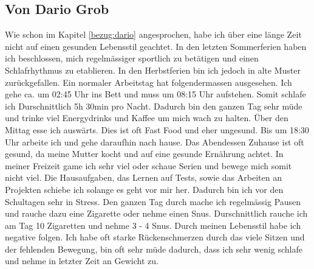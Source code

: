 \subsection{Von Dario Grob}
\authortoc{\dario}{\subsectionident}
Wie schon im Kapitel \ref{bezug:dario} angesprochen, habe ich über eine länge Zeit nicht auf einen gesunden Lebensstil geachtet. In den letzten Sommerferien haben ich beschlossen, mich regelmässiger sportlich zu betätigen und einen Schlafrhythmus zu etablieren. 
\newline
In den Herbstferien bin ich jedoch in alte Muster zurückgefallen. Ein normaler Arbeitstag hat folgendermassen ausgesehen.
\newline
Ich gehe ca. um 02:45 Uhr ins Bett und muss um 08:15 Uhr aufstehen. Somit schlafe ich Durschnittlich 5h 30min pro Nacht. Dadurch bin den ganzen Tag sehr müde und trinke viel Energydrinks und Kaffee um mich wach zu halten. 
\newline
Über den Mittag esse ich auswärts. Dies ist oft Fast Food und eher ungesund.
\newline
Bis um 18:30 Uhr arbeite ich und gehe daraufhin nach hause. Das Abendessen Zuhause ist oft gesund, da meine Mutter kocht und auf eine gesunde Ernährung achtet. 
\newline
In meiner Freizeit game ich sehr viel oder schaue Serien und bewege mich somit nicht viel. 
\newline
Die Hausaufgaben, das Lernen auf Tests, sowie das Arbeiten an Projekten schiebe ich solange es geht vor mir her. Dadurch bin ich vor den Schultagen sehr in Stress.
\newline
Den ganzen Tag durch mache ich regelmässig Pausen und rauche dazu eine Zigarette oder nehme einen Snus. Durschnittlich rauche ich am Tag 10 Zigaretten und nehme 3 - 4 Snus.
\newline
Durch meinen Lebensstil habe ich negative folgen. Ich habe oft starke Rückenschmerzen durch das viele Sitzen und der fehlenden Bewegung, bin oft sehr müde dadurch, dass ich sehr wenig schlafe und nehme in letzter Zeit an Gewicht zu.
